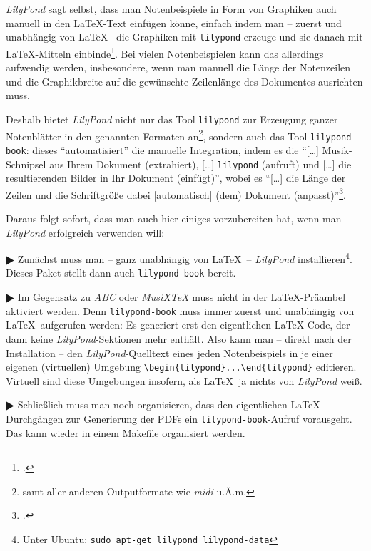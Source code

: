 \textit{LilyPond} sagt selbst, dass man Notenbeispiele in Form von Graphiken auch
manuell in den \LaTeX-Text einfügen könne, einfach indem man -- zuerst und
unabhängig von \LaTeX -- die Graphiken mit \texttt{lilypond} erzeuge und sie
danach mit \LaTeX-Mitteln einbinde\footcite[vgl.][20]{LilyPond2018e}. Bei vielen
Notenbeispielen kann das allerdings aufwendig werden, insbesondere, wenn man
manuell die Länge der Notenzeilen und die Graphikbreite auf die gewünschte
Zeilenlänge des Dokumentes ausrichten muss.

Deshalb bietet \textit{LilyPond} nicht nur das Tool \texttt{lilypond} zur
Erzeugung ganzer Notenblätter in den genannten Formaten an\footnote{samt aller
anderen Outputformate wie \textit{midi} u.Ä.m.}, sondern auch das Tool
\texttt{lilypond-book}: dieses \enquote{automatisiert} die manuelle Integration,
indem es die \enquote{[\ldots] Musik-Schnipsel aus Ihrem Dokument (extrahiert),
[\ldots] \texttt{lilypond} (aufruft) und [\ldots] die resultierenden Bilder in
Ihr Dokument (einfügt)}, wobei es \enquote{[\ldots] die Länge der Zeilen und die
Schriftgröße dabei [automatisch] (dem) Dokument
(anpasst)}\footcite[vgl.][20]{LilyPond2018e}.

Daraus folgt sofort, dass man auch hier einiges vorzubereiten hat, wenn man
\textit{LilyPond} erfolgreich verwenden will:

$\RHD$ Zunächst muss man -- ganz unabhängig von \LaTeX\ -- \textit{LilyPond}
installieren\footnote{Unter Ubuntu: \texttt{sudo apt-get lilypond
lilypond-data}}. Dieses Paket stellt dann auch \texttt{lilypond-book} bereit.
  
$\RHD$ Im Gegensatz zu \textit{ABC} oder \textit{MusiX\TeX} muss 
nicht in der \LaTeX-Präambel aktiviert werden. Denn \texttt{lilypond-book} muss
immer zuerst und unabhängig von \LaTeX\ aufgerufen werden: Es generiert erst den
eigentlichen \LaTeX-Code, der dann keine \textit{LilyPond}-Sektionen mehr
enthält. Also kann man -- direkt nach der Installation -- den
\textit{LilyPond}-Quelltext eines jeden Notenbeispiels in je einer eigenen
(virtuellen) Umgebung \verb|\begin{lilypond}...\end{lilypond}| editieren.
Virtuell sind diese Umgebungen insofern, als \LaTeX\ ja nichts von
\textit{LilyPond} weiß.

$\RHD$ Schließlich muss man noch organisieren, dass den eigentlichen
\LaTeX-Durchgängen zur Generierung der PDFs ein \texttt{lilypond-book}-Aufruf
vorausgeht. Das kann wieder in einem Makefile organisiert werden.

